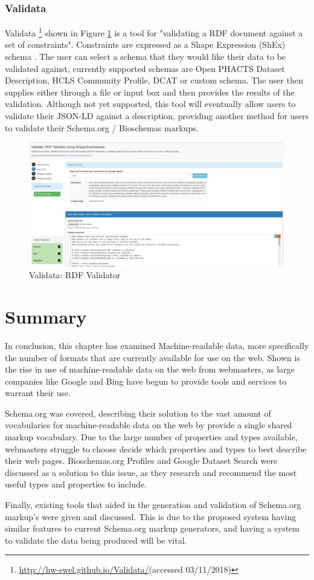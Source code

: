 \newpage
\subsubsection*{Validata}
Validata \footnote{\url{http://hw-swel.github.io/Validata/}(accessed 03/11/2018)} shown in Figure \ref{fig:validata} is a tool for "validating a RDF document against a set of constraints"\cite{hansen2015validata}. Constraints are expressed as a Shape Expression (ShEx) schema \cite{validataAG}. The user can select a schema that they would like their data to be validated against, currently supported schemas are Open PHACTS Dataset Description, HCLS Community Profile, DCAT or custom schema. The user then supplies either through a file or input box and then provides the results of the validation. Although not yet supported, this tool will eventually allow users to validate their JSON-LD against a description, providing another method for users to validate their Schema.org / Bioschemas markups.\newline

\begin{figure}[h]
 \centering\includegraphics[scale=0.35]{images/validata.PNG}
   \caption{Validata: RDF Validator}
   \label{fig:validata}
\end{figure}

\newpage 
\section{Summary}
In conclusion, this chapter has examined Machine-readable data, more specifically the number of formats that are currently available for use on the web. Shown is the rise in use of machine-readable data on the web from webmasters, as large companies like Google and Bing have begun to provide tools and services to warrant their use.

Schema.org was covered, describing their solution to the vast amount of vocabularies for machine-readable data on the web by provide a single shared markup vocabulary. Due to the large number of properties and types available, webmasters struggle to choose decide which properties and types to best describe their web pages. Bioschemas.org Profiles and Google Dataset Search were discussed as a solution to this issue, as they research and recommend the most useful types and properties to include.

Finally, existing tools that aided in the generation and validation of Schema.org markup's were given and discussed. This is due to the proposed system having similar features to current Schema.org markup generators, and having a system to validate the data being produced will be vital.


